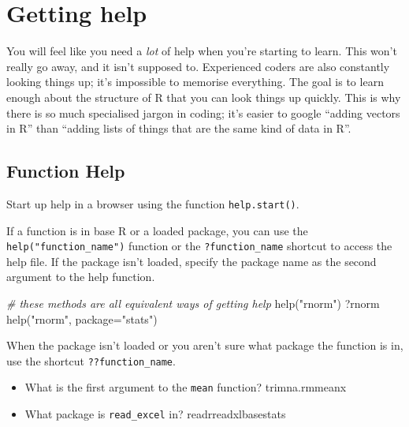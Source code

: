 \documentclass[
  oneside]{book}
\newenvironment{Shaded}{\begin{snugshade}}{\end{snugshade}}
\newcommand{\AttributeTok}[1]{\textcolor[rgb]{0.77,0.63,0.00}{#1}}
\newcommand{\CommentTok}[1]{\textcolor[rgb]{0.56,0.35,0.01}{\textit{#1}}}
\newcommand{\FunctionTok}[1]{\textcolor[rgb]{0.00,0.00,0.00}{#1}}
\newcommand{\NormalTok}[1]{#1}
\newcommand{\StringTok}[1]{\textcolor[rgb]{0.31,0.60,0.02}{#1}}
\providecommand{\tightlist}{%
  \setlength{\itemsep}{0pt}\setlength{\parskip}{0pt}}
\begin{document}
\hypertarget{help}{%
\section{Getting help}\label{help}}

You will feel like you need a \emph{lot} of help when you're starting to learn. This won't really go away, and it isn't supposed to. Experienced coders are also constantly looking things up; it's impossible to memorise everything. The goal is to learn enough about the structure of R that you can look things up quickly. This is why there is so much specialised jargon in coding; it's easier to google ``adding vectors in R'' than ``adding lists of things that are the same kind of data in R''.

\hypertarget{function-help}{%
\subsection{Function Help}\label{function-help}}

Start up help in a browser using the function \texttt{help.start()}.

If a function is in base R or a loaded package, you can use the \texttt{help("function\_name")} function or the \texttt{?function\_name} shortcut to access the help file. If the package isn't loaded, specify the package name as the second argument to the help function.

\begin{Shaded}
\begin{Highlighting}[]
\CommentTok{\# these methods are all equivalent ways of getting help}
\FunctionTok{help}\NormalTok{(}\StringTok{"rnorm"}\NormalTok{)}
\NormalTok{?rnorm}
\FunctionTok{help}\NormalTok{(}\StringTok{"rnorm"}\NormalTok{, }\AttributeTok{package=}\StringTok{"stats"}\NormalTok{) }
\end{Highlighting}
\end{Shaded}

When the package isn't loaded or you aren't sure what package the function is in, use the shortcut \texttt{??function\_name}.

\begin{try}

\begin{itemize}
\tightlist
\item
  What is the first argument to the \texttt{mean} function? trimna.rmmeanx
\item
  What package is \texttt{read\_excel} in? readrreadxlbasestats
\end{itemize}

\end{try}
\end{document}
